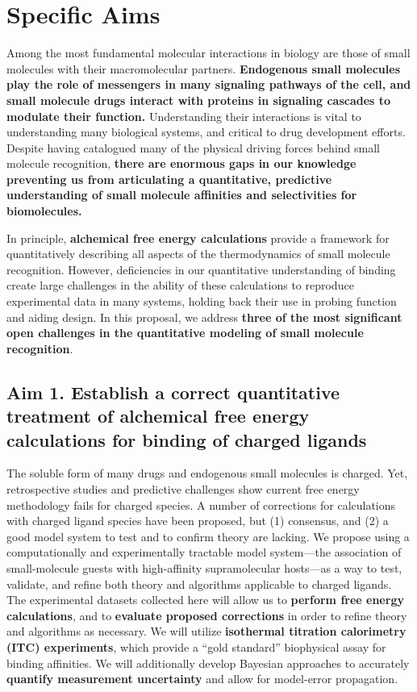 \documentclass[10pt,final]{article}
\date{}
\begin{document}
\newpage
\section*{\centering Specific Aims}
Among the most fundamental molecular interactions in biology are those of small molecules with their macromolecular partners.
\textbf{Endogenous small molecules play the role of messengers in many signaling pathways of the cell, and small molecule drugs interact with proteins in signaling cascades to modulate their function.}
Understanding their interactions is vital to understanding many biological systems, and critical to drug development efforts.
Despite having catalogued many of the physical driving forces behind small molecule recognition, \textbf{there are enormous gaps in our knowledge preventing us from articulating a quantitative, predictive understanding of small molecule affinities and selectivities for biomolecules.}

In principle, \textbf{alchemical free energy calculations} provide a framework for quantitatively describing all aspects of the thermodynamics of small molecule recognition. However, deficiencies in our quantitative understanding of binding create large challenges in the ability of these calculations to reproduce experimental data in many systems, holding back their use in probing function and aiding design.
In this proposal, we address \textbf{three of the most significant open challenges in the quantitative modeling of small molecule recognition}.

\subsection*{Aim 1. Establish a correct quantitative treatment of alchemical free energy calculations for binding of charged ligands}
The soluble form of many drugs and endogenous small molecules is charged.
Yet, retrospective studies and predictive challenges show current free energy methodology fails for charged species\cite{Rocklin2013b,Muddana2014a}.
A number of corrections for calculations with charged ligand species have been proposed, but (1) consensus, and (2) a good model system to test and to confirm theory are lacking.
We propose using a computationally and experimentally tractable model system---the association of small-molecule guests with high-affinity supramolecular hosts---as a way to test, validate, and refine both theory and algorithms applicable to charged ligands.
The experimental datasets collected here will allow us to \textbf{ perform free energy calculations}, and to \textbf{ evaluate proposed corrections} in order to refine theory and algorithms as necessary.
We will utilize \textbf{ isothermal titration calorimetry (ITC) experiments}, which provide a “gold standard” biophysical assay for binding affinities.
We will additionally develop Bayesian approaches to accurately \textbf{ quantify measurement uncertainty} and allow for model-error propagation. 
\end{document}

